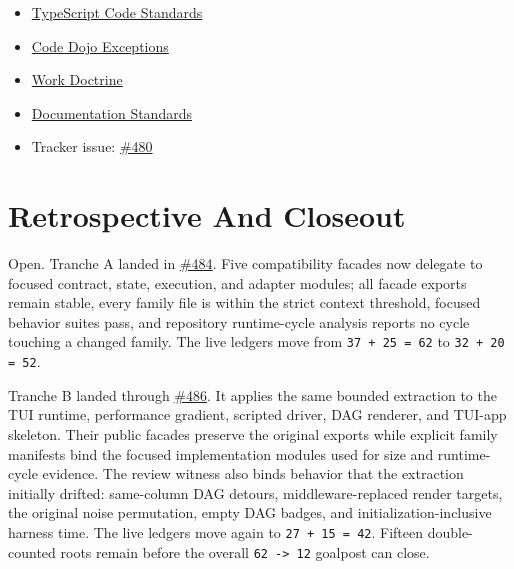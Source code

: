 \begin{itemize}
\tightlist
\item
  \href{https://github.com/flyingrobots/bijou/blob/cbd70612140e7a450d764b3c7be1c6af878b99bc/docs/typescript-code-standards.editors-edition.md}{TypeScript Code Standards}
\item
  \href{https://github.com/flyingrobots/bijou/blob/cbd70612140e7a450d764b3c7be1c6af878b99bc/docs/code-dojo-exceptions.md}{Code Dojo Exceptions}
\item
  \href{https://github.com/flyingrobots/bijou/blob/5b10cb89165b76673ffc60da59d7de5a531e55e9/docs/METHOD.md}{Work Doctrine}
\item
  \href{https://github.com/flyingrobots/bijou/blob/cbd70612140e7a450d764b3c7be1c6af878b99bc/docs/DOCUMENTATION_STANDARDS.md}{Documentation Standards}
\item
  Tracker issue: \href{https://github.com/flyingrobots/bijou/issues/480}{\#480}
\end{itemize}

\section{Retrospective And Closeout}\label{record-247-retrospective-and-closeout}

Open. Tranche A landed in \href{https://github.com/flyingrobots/bijou/pull/484}{\#484}. Five compatibility facades now delegate to focused contract, state, execution, and adapter modules; all facade exports remain stable, every family file is within the strict context threshold, focused behavior suites pass, and repository runtime-cycle analysis reports no cycle touching a changed family. The live ledgers move from \texttt{3\allowbreak{}7\allowbreak{} \allowbreak{}+\allowbreak{} \allowbreak{}2\allowbreak{}5\allowbreak{} \allowbreak{}=\allowbreak{} \allowbreak{}6\allowbreak{}2} to \texttt{3\allowbreak{}2\allowbreak{} \allowbreak{}+\allowbreak{} \allowbreak{}2\allowbreak{}0\allowbreak{} \allowbreak{}=\allowbreak{} \allowbreak{}5\allowbreak{}2}.

Tranche B landed through \href{https://github.com/flyingrobots/bijou/pull/486}{\#486}. It applies the same bounded extraction to the TUI runtime, performance gradient, scripted driver, DAG renderer, and TUI-app skeleton. Their public facades preserve the original exports while explicit family manifests bind the focused implementation modules used for size and runtime-cycle evidence. The review witness also binds behavior that the extraction initially drifted: same-column DAG detours, middleware-replaced render targets, the original noise permutation, empty DAG badges, and initialization-inclusive harness time. The live ledgers move again to \texttt{2\allowbreak{}7\allowbreak{} \allowbreak{}+\allowbreak{} \allowbreak{}1\allowbreak{}5\allowbreak{} \allowbreak{}=\allowbreak{} \allowbreak{}4\allowbreak{}2}. Fifteen double-counted roots remain before the overall \texttt{6\allowbreak{}2\allowbreak{} \allowbreak{}-\allowbreak{}>\allowbreak{} \allowbreak{}1\allowbreak{}2} goalpost can close.

